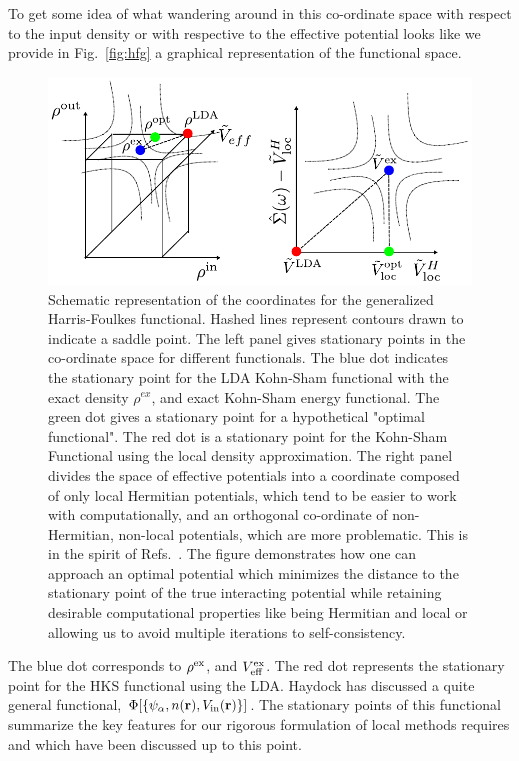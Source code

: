 To get some idea of what wandering around in this co-ordinate space
with respect to the input density or with respective to the effective potential looks like
we provide in Fig.~\ref{fig:hfg} a graphical representation of the functional space.
%
\begin{figure}
\begin{center}
\includegraphics{./GW/HFG_space.pdf}
\caption{Schematic representation of the coordinates for the generalized
Harris-Foulkes functional. Hashed lines represent contours drawn to indicate
a saddle point. The left panel gives stationary points in the co-ordinate space
for different functionals. The blue dot indicates the stationary point for the
LDA Kohn-Sham functional with the exact density $\rho^{ex}$, 
and exact Kohn-Sham energy functional. The green dot gives a stationary point
for a hypothetical "optimal functional". The red dot is a stationary point
for the Kohn-Sham Functional using the local density approximation. 
The right panel divides the space of effective potentials into a coordinate 
composed of only local Hermitian potentials, which tend 
to be easier to work with computationally, and an orthogonal co-ordinate 
of non-Hermitian, non-local potentials, which are more problematic. 
This is in the spirit of Refs.~\cite{sohrab10, patrick12, sohrab17}. 
The figure demonstrates how one can approach an optimal
potential which minimizes the distance to the stationary point of the true interacting potential
while retaining desirable computational properties like being Hermitian and local
or allowing us to avoid multiple iterations to self-consistency.\label{hfg}}
\end{center}
\end{figure}
%
The blue dot corresponds to $\rho^{\rm ex}$, and $V^{\rm ex}_{\rm eff}$. The red dot
represents the stationary point for the HKS functional using the LDA.
Haydock \cite{haydock97} has discussed a quite general functional,
$\Phi[\{\psi_{\alpha},n({\bf r}),V_{\rm in}({\bf r}) \}]$. The stationary points of
this functional summarize the key features for our rigorous formulation of local methods
requires and which have been discussed up to this point.


